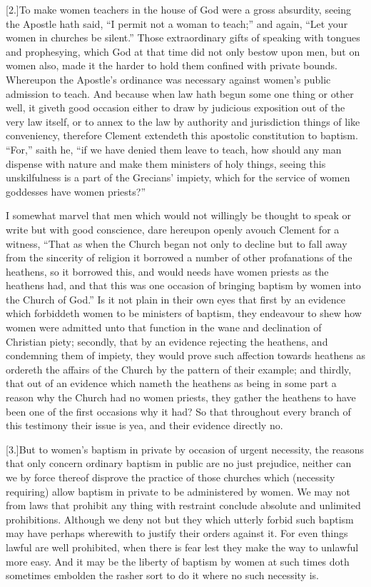 [2.]To make women teachers in the house of God were a gross absurdity, seeing the Apostle hath said, “I permit not a woman to teach;” and again, “Let your women in churches be silent.” Those extraordinary gifts of speaking with tongues and prophesying, which God at that time did not only bestow upon men, but on women also, made it the harder to hold them confined with private bounds. Whereupon the Apostle’s ordinance was necessary against women’s public admission to teach. And because when law hath begun some one thing or other well, it giveth good occasion either to draw by judicious exposition out of the very law itself, or to annex to the law by authority and jurisdiction things of like conveniency, therefore Clement extendeth this apostolic constitution to baptism. “For,” saith he, “if we have denied  them leave to teach, how should any man dispense with nature and make them ministers of holy things, seeing this unskilfulness is a part of the Grecians’ impiety, which for the service of women goddesses have women priests?”

I somewhat marvel that men which would not willingly be thought to speak or write but with good conscience, dare hereupon openly avouch Clement for a witness, “That as when the Church began not only to decline but to fall away from the sincerity of religion it borrowed a number of other profanations of the heathens, so it borrowed this, and would needs have women priests as the heathens had, and that this was one occasion of bringing baptism by women into the Church of God.” Is it not plain in their own eyes that first by an evidence which forbiddeth women to be ministers of baptism, they endeavour to shew how women were admitted unto that function in the wane and declination of Christian piety; secondly, that by an evidence rejecting the heathens, and condemning them of impiety, they would prove such affection towards heathens as ordereth the affairs of the Church by the pattern of their example; and thirdly, that out of an evidence which nameth the heathens as being in some part a reason why the Church had no women priests, they gather the heathens to have been one of the first occasions why it had? So that throughout every branch of this testimony their issue is yea, and their evidence directly no.

[3.]But to women’s baptism in private by occasion of urgent necessity, the reasons that only concern ordinary baptism in public are no just prejudice, neither can we by force thereof disprove the practice of those churches which (necessity requiring) allow baptism in private to be administered by women. We may not from laws that prohibit any thing with restraint conclude absolute and unlimited prohibitions. Although we deny not but they which utterly forbid such baptism may have perhaps wherewith to justify their orders against it. For even things lawful are well prohibited,  when there is fear lest they make the way to unlawful more easy.
 And it may be the liberty of baptism by women at such times doth sometimes embolden the rasher sort to do it where no such necessity is.

